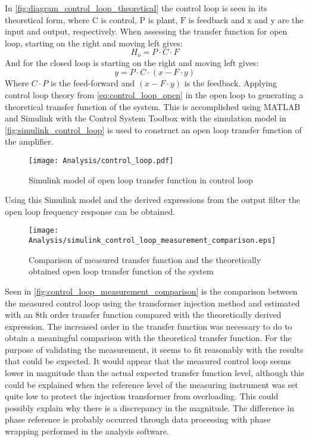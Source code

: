 In \autoref{fig:diagram_control_loop_theoretical} the control loop is seen in its theoretical form, where $\mathrm{C}$ is control, $\mathrm{P}$ is plant, $\mathrm{F}$ is feedback and $\mathrm{x}$ and $\mathrm{y}$ are the input and output, respectively. 
When assessing the transfer function for open loop, starting on the right and moving left gives:
\begin{equation} \label{eq:control_loop_open}
	H_{o} = P \cdot C \cdot F
\end{equation}
And for the closed loop is starting on the right and moving left gives:
\begin{equation} \label{eq:control_loop_closed}
	y = P \cdot C \cdot \left( x - F \cdot y \right) 
\end{equation}
Where $C \cdot P$ is the feed-forward and $\left( x - F \cdot y \right) $ is the feedback. Applying control loop theory from \autoref{eq:control_loop_open} in the open loop to generating a theoretical transfer function of the system. This is accomplished using MATLAB and Simulink with the Control System Toolbox \cite{matlab_control_toolbox} with the simulation model in \autoref{fig:simulink_control_loop} is used to construct an open loop transfer function of the amplifier.

\begin{figure}[htbp]
	\centering
	\texttt{[image: Analysis/control\_loop.pdf]}
	\caption{Simulink model of open loop transfer function in control loop}
	\label{fig:simulink_control_loop}
\end{figure}

Using this Simulink model and the derived expressions from the output filter  the open loop frequency response can be obtained.

\begin{figure}[htbp]
	\centering
	\texttt{[image: Analysis/simulink\_control\_loop\_measurement\_comparison.eps]}
	\caption{Comparison of measured transfer function and the theoretically obtained open loop transfer function of the system}
	\label{fig:control_loop_measurement_comparison}
\end{figure}

Seen in \autoref{fig:control_loop_measurement_comparison} is the comparison between the measured control loop using the transformer injection method and estimated with an 8th order transfer function compared with the theoretically derived expression. The increased order in the transfer function was necessary to do to obtain a meaningful comparison with the theoretical transfer function. For the purpose of validating the measurement, it seems to fit reasonably with the results that could be expected. It would appear that the measured control loop seems lower in magnitude than the actual expected transfer function level, although this could be explained when the reference level of the measuring instrument was set quite low to protect the injection transformer from overloading. This could possibly explain why there is a discrepancy in the magnitude. The difference in phase reference is probably occurred through data processing with phase wrapping performed in the analysis software.